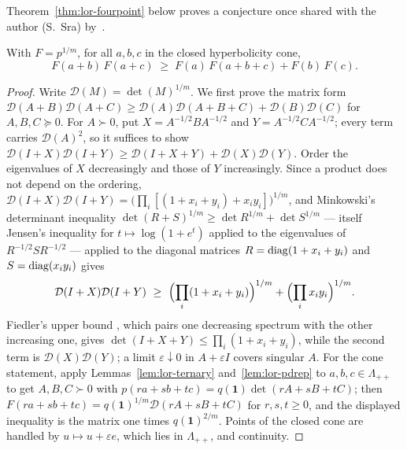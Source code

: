 
\noindent Theorem~\ref{thm:lor-fourpoint} below proves a conjecture once shared with the author (S.~Sra) by~\citet{thomas2025}.
\begin{theorem}[\statusproved]\label{thm:lor-fourpoint}
With $F=p^{1/m}$, for all $a,b,c$ in the closed hyperbolicity cone,
\[
F(a+b)\,F(a+c)\;\ge\;F(a)\,F(a+b+c)+F(b)\,F(c).
\]
\end{theorem}
\begin{proof}
Write $\mathcal D(M)=\det(M)^{1/m}$.  We first prove the matrix form
$\mathcal D(A+B)\mathcal D(A+C)\ge\mathcal D(A)\mathcal D(A+B+C)+\mathcal D(B)\mathcal D(C)$
for $A,B,C\succeq0$.  For $A\succ0$, put $X=A^{-1/2}BA^{-1/2}$ and
$Y=A^{-1/2}CA^{-1/2}$; every term carries $\mathcal D(A)^2$, so it suffices to
show $\mathcal D(I+X)\mathcal D(I+Y)\ge\mathcal D(I+X+Y)+\mathcal D(X)\mathcal D(Y)$.
Order the eigenvalues of $X$ decreasingly and those of $Y$ increasingly.  Since a
product does not depend on the ordering,
$\mathcal D(I+X)\mathcal D(I+Y)=\bigl(\prod_i[(1+x_i+y_i)+x_iy_i]\bigr)^{1/m}$, and
Minkowski's determinant inequality
$\det(R+S)^{1/m}\ge\det R^{1/m}+\det S^{1/m}$ --- itself Jensen's inequality for
$t\mapsto\log(1+e^t)$ applied to the eigenvalues of $R^{-1/2}SR^{-1/2}$ ---
applied to the diagonal matrices $R=\operatorname{diag}(1+x_i+y_i)$ and $S=\operatorname{diag}(x_iy_i)$
gives
\[
\mathcal D(I+X)\mathcal D(I+Y)\ \ge\ \Bigl(\prod_i(1+x_i+y_i)\Bigr)^{1/m}
+\Bigl(\prod_ix_iy_i\Bigr)^{1/m}.
\]
Fiedler's upper bound \citep{Fiedler1971}, which pairs one decreasing spectrum
with the other increasing one, gives $\det(I+X+Y)\le\prod_i(1+x_i+y_i)$, while
the second term is $\mathcal D(X)\mathcal D(Y)$; a limit $\varepsilon\downarrow0$
in $A+\varepsilon I$ covers singular $A$.  For the cone statement, apply
Lemmas~\ref{lem:lor-ternary} and~\ref{lem:lor-pdrep} to $a,b,c\in\Lambda_{++}$ to
get $A,B,C\succ0$ with $p(ra+sb+tc)=q(\mathbf 1)\det(rA+sB+tC)$; then
$F(ra+sb+tc)=q(\mathbf 1)^{1/m}\mathcal D(rA+sB+tC)$ for $r,s,t\ge0$, and the
displayed inequality is the matrix one times $q(\mathbf 1)^{2/m}$.  Points of the
closed cone are handled by $u\mapsto u+\varepsilon e$, which lies in
$\Lambda_{++}$, and continuity.
\end{proof}

